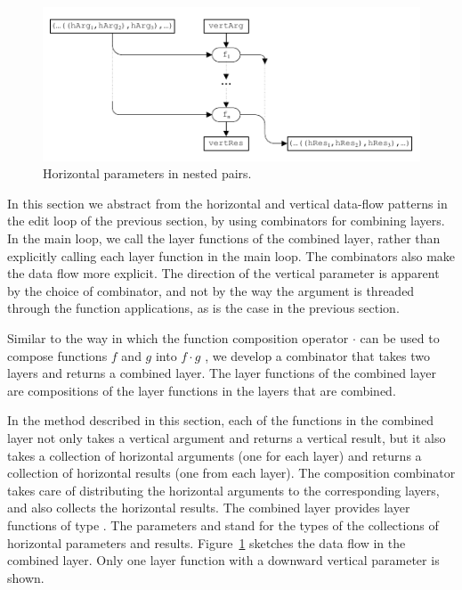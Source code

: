 \documentclass[preprint,natbib]{sigplanconf}
\begin{document}
\begin{figure}
\includegraphics[width=\columnwidth]{images/NestedPairs}
\caption{Horizontal parameters in nested pairs.}\label{ncp} 
\end{figure}


In this section we abstract from the horizontal and vertical data-flow patterns in the edit loop of the previous section, by using combinators for combining layers. In the main loop, we call the layer functions of the combined layer, rather than explicitly calling each layer function in the main loop. The combinators also make the data flow more explicit. The direction of the vertical parameter is apparent by the choice of   combinator, and not by the way the argument is threaded through the function applications, as is the case in the previous section. 

Similar to the way in which the function composition operator $\cdot$ can be used to compose functions $f$ and $g$ into $f \cdot g$ , we develop a  combinator that takes two layers and returns a combined layer. The layer functions of the combined layer are compositions of the layer functions in the layers that are combined.

In the method described in this section, each of the functions in the combined layer not only takes a vertical argument and returns a vertical result, but it also takes a collection of horizontal arguments (one for each layer) and returns a collection of horizontal results (one from each layer). The composition combinator takes care of distributing the horizontal arguments to the corresponding layers, and also collects the horizontal results. The combined layer provides layer functions of type . The parameters  and  stand for the types of the collections of horizontal parameters and results. Figure~\ref{ncp} sketches the data flow in the combined layer. Only one layer function with a downward vertical parameter is shown.
\end{document}
